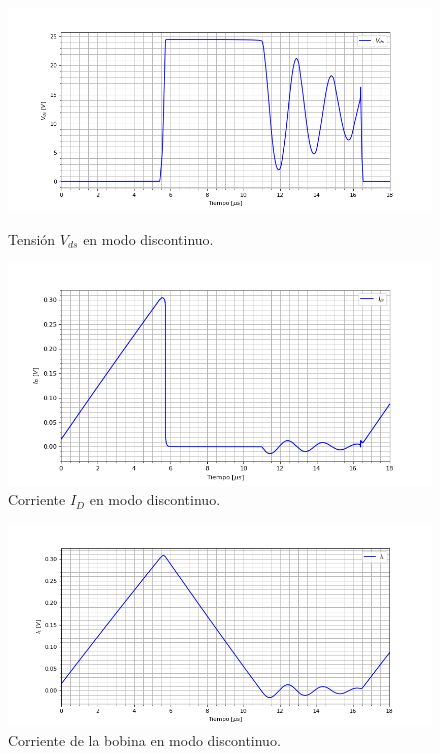 \begin{figure}[H]
	\centering
	\begin{minipage}{0.495\textwidth}
		\centering
		\includegraphics[width=\textwidth]{ImagenesEjercicio-4/vds} %
		\caption{Tensión $V_{ds}$ en modo discontinuo.}
		\label{ej4:fig:vds}
	\end{minipage}\hfill
	\begin{minipage}{0.495\textwidth}
		\centering
		\includegraphics[width=\textwidth]{ImagenesEjercicio-4/id} %
		\caption{Corriente $I_{D}$ en modo discontinuo.}
		\label{ej4:fig:id}
	\end{minipage}
\end{figure} 

\begin{figure}[H]
	\centering
	\includegraphics[width=0.7\linewidth, page=1]{ImagenesEjercicio-4/il}
	\caption{Corriente de la bobina en modo discontinuo.}
	\label{ej4:fig:il}
\end{figure}

